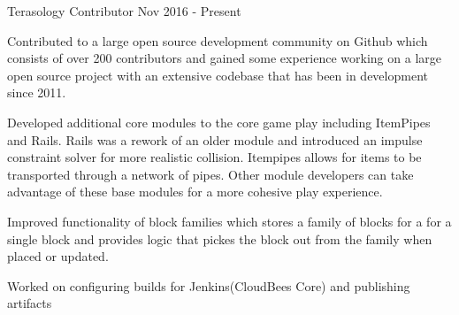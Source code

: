\begin{cventries}
{\begin{cvitems}
      \end{cvitems}
    }

  \cventry
    {Terasology} %
    {Contributor} %
    {} %
    { Nov 2016 - Present} %
    {
      \begin{cvitems} %
        \item{Contributed to a large open source development community on Github which consists of over 200 contributors and gained some experience working on a large open source project with an extensive codebase that has been in development since 2011.}
        \item{Developed additional core modules to the core game play including ItemPipes and Rails. Rails was a rework of an older module and introduced an impulse constraint solver for more realistic collision. Itempipes allows for items to be transported through a network of pipes. Other module developers can take advantage of these base modules for a more cohesive play experience. }
        \item{Improved functionality of block families which stores a family of blocks for a for a single block and provides logic that pickes the block out from the family when placed or updated.}
        \item{Worked on configuring builds for Jenkins(CloudBees Core) and publishing artifacts }
      \end{cvitems}
    }
    

\end{cventries}
